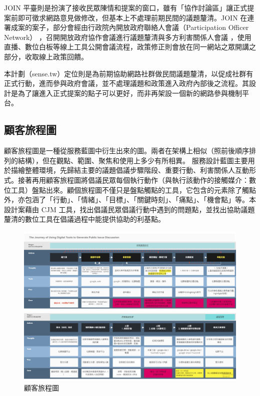 \documentclass[12pt,a4paper]{article}
\begin{document}
\begin{enumerate}
JOIN 平臺則是扮演了接收民眾陳情和提案的窗口，雖有「協作討論區」讓正式提案前即可徵求網路意見做修改，但基本上不處理前期民間的議題釐清。JOIN 在連署成案的案子，部分會經由行政院內開放政府聯絡人會議（Participation Officer Network）\citep*{lin17} ，召開開放政府協作會議進行議題釐清與多方利害關係人會議 ，使用直播、數位白板等線上工具公開會議流程，政策修正則會放在同一網站之眾開講之部分，收取線上政策回饋。

本計劃（sense.tw）定位則是為前期協助網路社群做民間議題釐清，以促成社群有正式行動，進而參與政府會議，並不處理議題和政策進入政府內部後之流程。其設計是為了讓進入正式提案的點子可以更好，而非再架設一個新的網路參與機制平台。
\end{enumerate}
\subsection{顧客旅程圖 }
\label{sec:org62690f1}
顧客旅程圖是一種從服務藍圖中衍生出來的圖。兩者在架構上相似（照前後順序排列的結構），但在觀點、範圍、聚焦和使用上多少有所相異。\cite{james2017} 服務設計藍圖主要用於描繪整體環境，先歸結主要的議題倡議步驟階段、重要行動、利害關係人互動形式。接著再用顧客旅程圖將倡議民眾每個執行動作（與執行該動作的接觸媒介：數位工具）盤點出來。顧個旅程圖不僅只是盤點觸點的工具，它包含的元素除了觸點外，亦包涵了「行動」、「情緒」、「目標」、「關鍵時刻」、「痛點」、「機會點」等。本設計案藉由 CJM 工具，找出倡議民眾倡議行動中遇到的問題點，並找出協助議題釐清的數位工具在倡議過程中能提供協助的利基點。
\begin{figure}[htbp]
\centering
\includegraphics[width=.9\linewidth]{./images/cmj1.jpg}
\caption{\label{fig:org9ae4304}
顧客旅程圖}
\end{figure}
\end{document}
